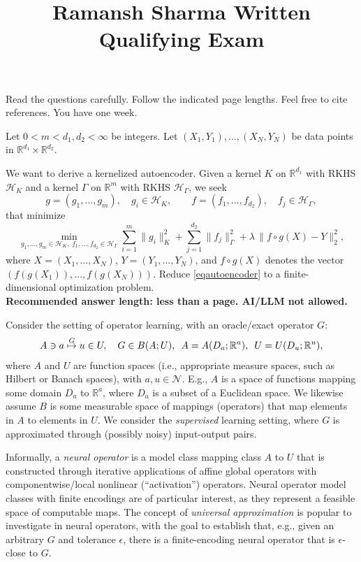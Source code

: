 \documentclass[12pt]{exam}
\def\R{\mathbb{R}}
\def\H{\mathcal{H}}
\def\N{\mathcal{N}}
\begin{document}
\title{Ramansh Sharma Written Qualifying Exam}
\date{}
\maketitle


\noindent Read the questions carefully. Follow the indicated page lengths. Feel free to cite references. You have one week. 

\begin{questions}
\question Let $0<m<d_1,d_2<\infty$ be integers.  
Let $(X_1,Y_1),\dots,(X_N,Y_N)$ be data points in $\R^{d_1}\times\R^{d_2}$.  

We want to derive a kernelized autoencoder.  
Given a kernel $K$ on $\R^{d_1}$ with RKHS $\H_K$ and a kernel $\Gamma$ on $\R^m$ with RKHS $\H_\Gamma$, we seek 
\[
  g=(g_1,\dots,g_m),\quad g_i\in \H_K, 
  \qquad 
  f=(f_1,\dots,f_{d_2}),\quad f_j\in\H_\Gamma,
\]
that minimize
\begin{equation}\label{eqautoencoder}
\min_{g_1,\ldots,g_m \in \H_K,\; f_1,\ldots,f_{d_2} \in \H_\Gamma} 
\sum_{i=1}^m \|g_i\|_K^2
+ \sum_{j=1}^{d_2}\|f_j\|_\Gamma^2
+ \lambda \,\big\| f\circ g(X)-Y\big\|_2^2,
\end{equation}
where $X=(X_1,\ldots,X_N)$, $Y=(Y_1,\ldots,Y_N)$, and $f\circ g(X)$ denotes the vector $(f(g(X_1)),\dots,f(g(X_N)))$.  
Reduce \eqref{eqautoencoder} to a finite-dimensional optimization problem.\\
{\bf Recommended answer length: less than a page. AI/LLM not allowed.}
%


\question Consider the setting of operator learning, with an oracle/exact operator $G$:
\begin{align*}
  A \ni a \stackrel{G}{\mapsto} u \in U, \hskip 10pt
  G \in B(A; U), \hskip 5pt A = A(D_a; \R^a), \hskip 5pt U = U(D_u; \R^u),
\end{align*}
where $A$ and $U$ are function spaces (i.e., appropriate measure spaces, such as Hilbert or Banach spaces), with $a, u \in \N$. E.g., $A$ is a space of functions mapping some domain $D_a$ to $\R^a$, where $D_a$ is a subset of a Euclidean space. We likewise assume $B$ is some measurable space of mappings (operators) that map elements in $A$ to elements in $U$. We consider the \textit{supervised} learning setting, where $G$ is approximated through (possibly noisy) input-output pairs.

Informally, a \textit{neural operator} is a model class mapping class $A$ to $U$ that is constructed through iterative applications of affine global operators with componentwise/local nonlinear (``activation'') operators. Neural operator model classes with finite encodings are of particular interest, as they represent a feasible space of computable maps. The concept of \textit{universal approximation} is popular to investigate in neural operators, with the goal to establish that, e.g., given an arbitrary $G$ and tolerance $\epsilon$, there is a finite-encoding neural operator that is $\epsilon$-close to $G$.


\end{questions}
\end{document}
